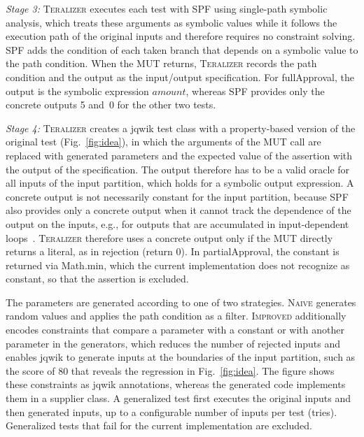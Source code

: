 \documentclass[10pt,conference]{IEEEtran}
\newcommand{\Teralizer}{\textsc{Teralizer}}
\newcommand{\codefont}{\fontfamily{lmtt}\selectfont}
\newcommand{\code}[1]{{\codefont #1}}
\newcommand{\runin}[1]{\textit{#1:}}
\newcommand{\Naive}{\textsc{Naive}}
\newcommand{\Improved}{\textsc{Improved}}
\begin{document}
\runin{Stage 3}
\Teralizer{} executes each test with SPF using single-path symbolic analysis, which treats these arguments as symbolic values while it follows the execution path of the original inputs and therefore requires no constraint solving.
SPF adds the condition of each taken branch that depends on a symbolic value to the path condition.
When the MUT returns, \Teralizer{} records the path condition and the output as the input/output specification.
For \code{fullApproval}, the output is the symbolic expression $\mathit{amount}$, whereas SPF provides only the concrete outputs 5 and~0 for the other two tests.

\runin{Stage 4}
\Teralizer{} creates a jqwik test class with a property-based version of the original test (Fig.~\ref{fig:idea}), in which the arguments of the MUT call are replaced with generated parameters and the expected value of the assertion with the output of the specification.
The output therefore has to be a valid oracle for all inputs of the input partition, which holds for a symbolic output expression.
A concrete output is not necessarily constant for the input partition, because SPF also provides only a concrete output when it cannot track the dependence of the output on the inputs, e.g., for outputs that are accumulated in input-dependent loops~\cite{glock_2025_teralizer}.
\Teralizer{} therefore uses a concrete output only if the MUT directly returns a literal, as in \code{rejection} (\code{return 0}).
In \code{partialApproval}, the constant is returned via \code{Math.min}, which the current implementation does not recognize as constant, so that the assertion is excluded.

The parameters are generated according to one of two strategies.
\Naive{} generates random values and applies the path condition as a filter.
\Improved{} additionally encodes constraints that compare a parameter with a constant or with another parameter in the generators, which reduces the number of rejected inputs and enables jqwik to generate inputs at the boundaries of the input partition, such as the score of 80 that reveals the regression in Fig.~\ref{fig:idea}.
The figure shows these constraints as jqwik annotations, whereas the generated code implements them in a supplier class.
A generalized test first executes the original inputs and then generated inputs, up to a configurable number of inputs per test (tries).
Generalized tests that fail for the current implementation are excluded.
\end{document}

